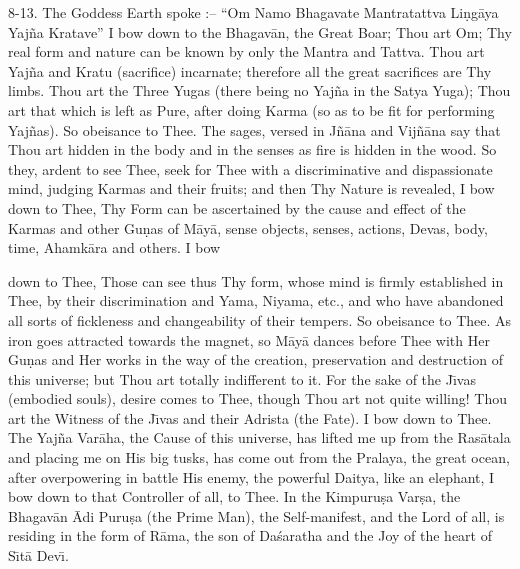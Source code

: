 8-13. The Goddess Earth spoke :-- ``Om Namo Bhagavate Mantratattva Li\d{n}g\=aya Yaj\~na Kratave'' I bow down to the Bhagav\=an, the Great Boar; Thou art Om; Thy real form and nature can be known by only the Mantra and Tattva. Thou art Yaj\~na and Kratu (sacrifice) incarnate; therefore all the great sacrifices are Thy limbs. Thou art the Three Yugas (there being no Yaj\~na in the Satya Yuga); Thou art that which is left as Pure, after doing Karma (so as to be fit for performing Yaj\~nas). So obeisance to Thee. The sages, versed in J\~n\=ana and Vij\~n\=ana say that Thou art hidden in the body and in the senses as fire is hidden in the wood. So they, ardent to see Thee, seek for Thee with a discriminative and dispassionate mind, judging Karmas and their fruits; and then Thy Nature is revealed, I bow down to Thee, Thy Form can be ascertained by the cause and effect of the Karmas and other Gu\d{n}as of M\=ay\=a, sense objects, senses, actions, Devas, body, time, Ahamk\=ara and others. I bow

down to Thee, Those can see thus Thy form, whose mind is firmly established in Thee, by their discrimination and Yama, Niyama, etc., and who have abandoned all sorts of fickleness and changeability of their tempers. So obeisance to Thee. As iron goes attracted towards the magnet, so M\=ay\=a dances before Thee with Her Gu\d{n}as and Her works in the way of the creation, preservation and destruction of this universe; but Thou art totally indifferent to it. For the sake of the J\={\i}vas (embodied souls), desire comes to Thee, though Thou art not quite willing! Thou art the Witness of the J\={\i}vas and their Adrista (the Fate). I bow down to Thee. The Yaj\~na Var\=aha, the Cause of this universe, has lifted me up from the Ras\=atala and placing me on His big tusks, has come out from the Pralaya, the great ocean, after overpowering in battle His enemy, the powerful Daitya, like an elephant, I bow down to that Controller of all, to Thee. In the Kimpuru\d{s}a Var\d{s}a, the Bhagav\=an \=Adi Puru\d{s}a (the Prime Man), the Self-manifest, and the Lord of all, is residing in the form of R\=ama, the son of Da\'saratha and the Joy of the heart of S\={\i}t\=a Dev\={\i}.


